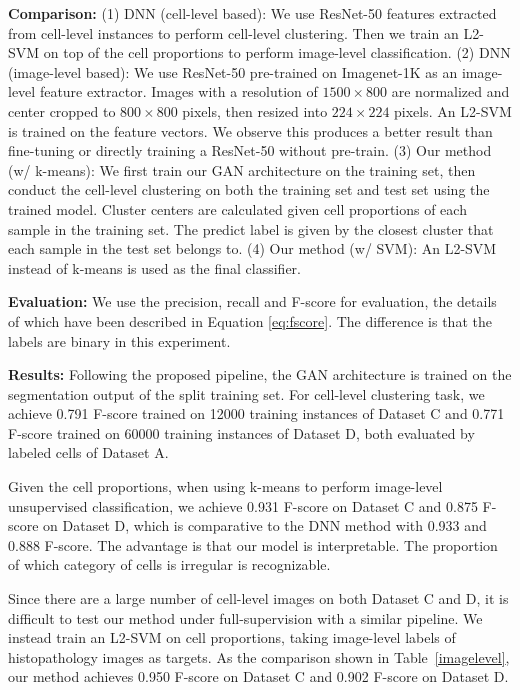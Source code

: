 \documentclass[journal]{IEEEtran}
\begin{document}
{\textbf{Comparison:} (1) DNN (cell-level based): We use ResNet-50 features extracted from cell-level instances to perform cell-level clustering. Then we train an L2-SVM on top of the cell proportions to perform image-level classification. (2) DNN (image-level based): We use ResNet-50 pre-trained on Imagenet-1K as an image-level feature extractor. Images with a resolution of $1500 \times 800$ are normalized and center cropped to $800 \times 800$ pixels, then resized into $224 \times 224$ pixels. An L2-SVM is trained on the feature vectors. We observe this produces a better result than fine-tuning or directly training a ResNet-50 without pre-train.} (3) Our method (w/ k-means): We first train our GAN architecture on the training set, then conduct the cell-level clustering on both the training set and test set using the trained model. Cluster centers are calculated given cell proportions of each sample in the training set. The predict label is given by the closest cluster that each sample in the test set belongs to. (4) Our method (w/ SVM): An L2-SVM instead of k-means is used as the final classifier.

\textbf{Evaluation:} We use the precision, recall and F-score for evaluation, the details of which have been described in Equation \ref{eq:fscore}. The difference is that the labels are binary in this experiment.


{{\textbf{Results:} Following the proposed pipeline, the GAN architecture is trained on the segmentation output of the split training set. For cell-level clustering task, we achieve 0.791 F-score trained on 12000 training instances of Dataset C and 0.771 F-score trained on 60000 training instances of Dataset D, both evaluated by labeled cells of Dataset A. 

Given the cell proportions, when using k-means to perform image-level unsupervised classification, we achieve 0.931 F-score on Dataset C and 0.875 F-score on Dataset D, which is comparative to the DNN method with 0.933 and 0.888 F-score. The advantage is that our model is interpretable. The proportion of which category of cells is irregular is recognizable.

Since there are a large number of cell-level images on both Dataset C and D, it is difficult to test our method under full-supervision with a similar pipeline. We instead train an L2-SVM on cell proportions, taking image-level labels of histopathology images as targets. As the comparison shown in Table~\ref{imagelevel}, our method achieves 0.950 F-score on Dataset C and 0.902 F-score on Dataset D.}}
\end{document}
